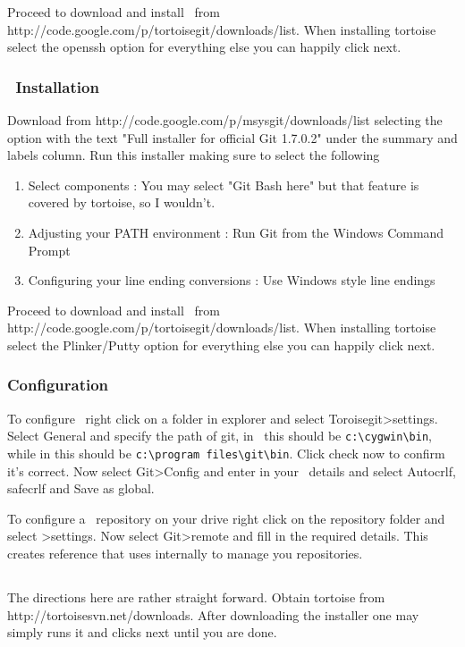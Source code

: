 Proceed to download and install \git\ from http://code.google.com/p/tortoisegit/downloads/list. When installing tortoise select the openssh option for everything else you can happily click next.

\subsubsection{\msys\ Installation}

Download \msys from http://code.google.com/p/msysgit/downloads/list selecting the option with the text "Full installer for official Git 1.7.0.2" under the summary and labels column. Run this installer  making sure to select the following
\begin{enumerate}
\item Select components : You may select "Git Bash here" but that feature is covered by tortoise, so I wouldn't.
\item Adjusting your PATH environment : Run Git from the Windows Command Prompt
\item Configuring your line ending conversions : Use Windows style line endings
\end{enumerate}

Proceed to download and install \git\ from http://code.google.com/p/tortoisegit/downloads/list. When installing tortoise select the Plinker/Putty option for everything else you can happily click next. 

\subsubsection{Configuration}
To configure \git\ right click on a folder in explorer and select Toroisegit>settings. Select General and specify the path of git, in \cyg\ this should be \verb|c:\cygwin\bin|, while in \msys this should be \verb|c:\program files\git\bin|. Click check now to confirm it's correct. Now select Git>Config and enter in your \gh\ details and select Autocrlf, safecrlf and Save as global.

To configure a \git\ repository on your drive right click on the repository folder and select \git >settings. Now select Git>remote and fill in the required details. This creates  reference that \git uses internally to manage you repositories.

\subsection{\hg}

The directions here are rather straight forward. Obtain tortoise from http://tortoisesvn.net/downloads. After downloading the installer one may simply runs it and clicks next until you are done.
